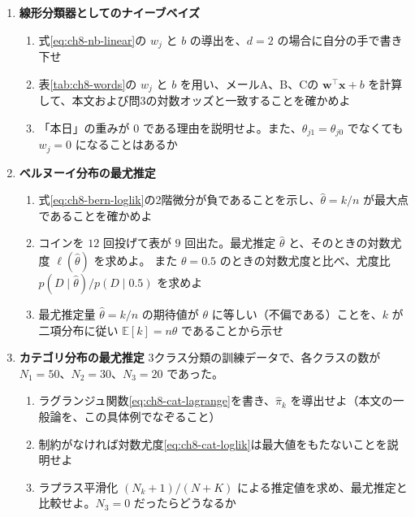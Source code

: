 \begin{enumerate}
  \item \textbf{線形分類器としてのナイーブベイズ}\quad
    \begin{enumerate}
      \item 式\eqref{eq:ch8-nb-linear}の $w_j$ と $b$ の導出を、$d = 2$ の場合に自分の手で書き下せ
      \item 表\ref{tab:ch8-words}の $w_j$ と $b$ を用い、メールA、B、Cの $\bm{w}^\top\bm{x} + b$ を計算して、本文および問3の対数オッズと一致することを確かめよ
      \item 「本日」の重みが $0$ である理由を説明せよ。また、$\theta_{j1} = \theta_{j0}$ でなくても $w_j = 0$ になることはあるか
    \end{enumerate}

  \item \textbf{ベルヌーイ分布の最尤推定}\quad
    \begin{enumerate}
      \item 式\eqref{eq:ch8-bern-loglik}の2階微分が負であることを示し、$\hat{\theta} = k/n$ が最大点であることを確かめよ
      \item コインを $12$ 回投げて表が $9$ 回出た。最尤推定 $\hat{\theta}$ と、そのときの対数尤度 $\ell(\hat{\theta})$ を求めよ。
        また $\theta = 0.5$ のときの対数尤度と比べ、尤度比 $p(D \mid \hat{\theta}) / p(D \mid 0.5)$ を求めよ
      \item 最尤推定量 $\hat{\theta} = k/n$ の期待値が $\theta$ に等しい（不偏である）ことを、$k$ が二項分布に従い $\mathbb{E}[k] = n\theta$ であることから示せ
    \end{enumerate}

  \item \textbf{カテゴリ分布の最尤推定}\quad
    3クラス分類の訓練データで、各クラスの数が $N_1 = 50$、$N_2 = 30$、$N_3 = 20$ であった。
    \begin{enumerate}
      \item ラグランジュ関数\eqref{eq:ch8-cat-lagrange}を書き、$\hat{\pi}_k$ を導出せよ（本文の一般論を、この具体例でなぞること）
      \item 制約がなければ対数尤度\eqref{eq:ch8-cat-loglik}は最大値をもたないことを説明せよ
      \item ラプラス平滑化 $(N_k + 1)/(N + K)$ による推定値を求め、最尤推定と比較せよ。$N_3 = 0$ だったらどうなるか
    \end{enumerate}


\end{enumerate}
